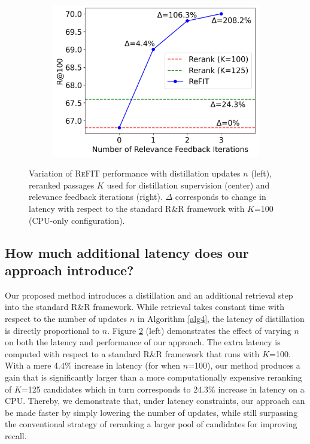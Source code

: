 \begin{figure}[t]
\begin{subfigure}[c]{0.32\linewidth}
     \includegraphics[width=0.95\linewidth]{submissions/Revanth2024/figures/num_iter_variation.png}
     \label{fig:qvec_1}
     \end{subfigure}
     \vspace{-0.5em}
    \caption{Variation of \textsc{ReFIT} performance with distillation updates $n$ (left), reranked passages $K$ used for distillation supervision (center) and relevance feedback iterations (right). $\Delta$ corresponds to change in latency with respect to the standard R\&R framework with $K$=100 (CPU-only configuration).}
    \label{fig:latency_performance}
\end{figure}


\subsection{How much additional latency does our approach introduce?}
\label{sec:additional_latency}

Our proposed method introduces a distillation and an additional retrieval step into the standard R\&R framework. While retrieval takes constant time with respect to the number of updates $n$ in Algorithm \ref{alg4}, the latency of distillation is directly proportional to $n$. Figure \ref{fig:latency_performance} (left) demonstrates the effect of varying $n$ on both the latency and performance of our approach. The extra latency is computed with respect to a standard R\&R framework that runs with $K$=100.
With a mere 4.4\% increase in latency (for when $n$=100), our method produces a gain that is significantly larger than a more computationally expensive reranking of $K$=125 candidates which in turn corresponds to 24.3\% increase in latency on a CPU. Thereby, we demonstrate that, under latency constraints, our approach can be made faster by simply lowering the number of updates, while still surpassing the conventional strategy of reranking a larger pool of candidates for improving recall.


